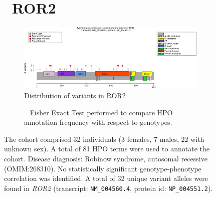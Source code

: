 \begin{figure}[htbp]
\section*{ ROR2}
\centering
\begin{subfigure}[b]{0.95\textwidth}
\centering
\includegraphics[width=\textwidth]{ img/ROR2_protein_diagram.pdf} 
\captionsetup{justification=raggedright,singlelinecheck=false}
\caption{Distribution of variants in ROR2}
\end{subfigure}

\vspace{2em}

\begin{subfigure}[b]{0.95\textwidth}
\centering
{}
\captionsetup{justification=raggedright,singlelinecheck=false}
\caption{             Fisher Exact Test performed to compare HPO annotation frequency with respect to genotypes. }
\end{subfigure}

\vspace{2em}

\caption{ The cohort comprised 32 individuals (3 females, 7 males, 22 with unknown sex). A total of 81 HPO terms were used to annotate the cohort. Disease diagnosis: Robinow syndrome, autosomal recessive (OMIM:268310). No statistically significant genotype-phenotype correlation was identified. A total of 32 unique variant alleles were found in \textit{ROR2} (transcript: \texttt{NM\_004560.4}, protein id: \texttt{NP\_004551.2}).}
\end{figure}
